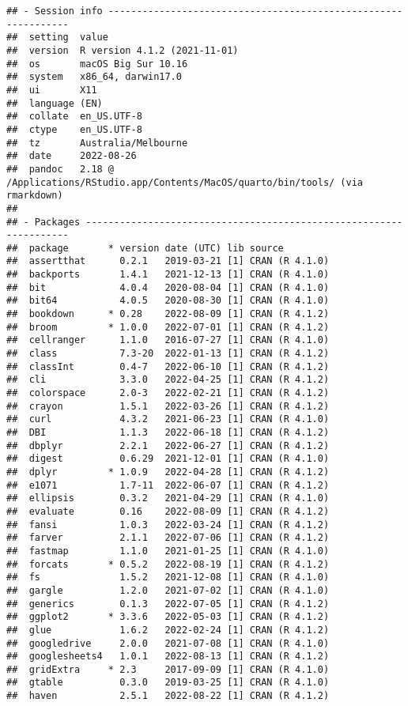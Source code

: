 \documentclass[
]{article}
\begin{document}
\begin{verbatim}
## - Session info ---------------------------------------------------------------
##  setting  value
##  version  R version 4.1.2 (2021-11-01)
##  os       macOS Big Sur 10.16
##  system   x86_64, darwin17.0
##  ui       X11
##  language (EN)
##  collate  en_US.UTF-8
##  ctype    en_US.UTF-8
##  tz       Australia/Melbourne
##  date     2022-08-26
##  pandoc   2.18 @ /Applications/RStudio.app/Contents/MacOS/quarto/bin/tools/ (via rmarkdown)
## 
## - Packages -------------------------------------------------------------------
##  package       * version date (UTC) lib source
##  assertthat      0.2.1   2019-03-21 [1] CRAN (R 4.1.0)
##  backports       1.4.1   2021-12-13 [1] CRAN (R 4.1.0)
##  bit             4.0.4   2020-08-04 [1] CRAN (R 4.1.0)
##  bit64           4.0.5   2020-08-30 [1] CRAN (R 4.1.0)
##  bookdown      * 0.28    2022-08-09 [1] CRAN (R 4.1.2)
##  broom         * 1.0.0   2022-07-01 [1] CRAN (R 4.1.2)
##  cellranger      1.1.0   2016-07-27 [1] CRAN (R 4.1.0)
##  class           7.3-20  2022-01-13 [1] CRAN (R 4.1.2)
##  classInt        0.4-7   2022-06-10 [1] CRAN (R 4.1.2)
##  cli             3.3.0   2022-04-25 [1] CRAN (R 4.1.2)
##  colorspace      2.0-3   2022-02-21 [1] CRAN (R 4.1.2)
##  crayon          1.5.1   2022-03-26 [1] CRAN (R 4.1.2)
##  curl            4.3.2   2021-06-23 [1] CRAN (R 4.1.0)
##  DBI             1.1.3   2022-06-18 [1] CRAN (R 4.1.2)
##  dbplyr          2.2.1   2022-06-27 [1] CRAN (R 4.1.2)
##  digest          0.6.29  2021-12-01 [1] CRAN (R 4.1.0)
##  dplyr         * 1.0.9   2022-04-28 [1] CRAN (R 4.1.2)
##  e1071           1.7-11  2022-06-07 [1] CRAN (R 4.1.2)
##  ellipsis        0.3.2   2021-04-29 [1] CRAN (R 4.1.0)
##  evaluate        0.16    2022-08-09 [1] CRAN (R 4.1.2)
##  fansi           1.0.3   2022-03-24 [1] CRAN (R 4.1.2)
##  farver          2.1.1   2022-07-06 [1] CRAN (R 4.1.2)
##  fastmap         1.1.0   2021-01-25 [1] CRAN (R 4.1.0)
##  forcats       * 0.5.2   2022-08-19 [1] CRAN (R 4.1.2)
##  fs              1.5.2   2021-12-08 [1] CRAN (R 4.1.0)
##  gargle          1.2.0   2021-07-02 [1] CRAN (R 4.1.0)
##  generics        0.1.3   2022-07-05 [1] CRAN (R 4.1.2)
##  ggplot2       * 3.3.6   2022-05-03 [1] CRAN (R 4.1.2)
##  glue            1.6.2   2022-02-24 [1] CRAN (R 4.1.2)
##  googledrive     2.0.0   2021-07-08 [1] CRAN (R 4.1.0)
##  googlesheets4   1.0.1   2022-08-13 [1] CRAN (R 4.1.2)
##  gridExtra     * 2.3     2017-09-09 [1] CRAN (R 4.1.0)
##  gtable          0.3.0   2019-03-25 [1] CRAN (R 4.1.0)
##  haven           2.5.1   2022-08-22 [1] CRAN (R 4.1.2)

\end{verbatim}
\end{document}
